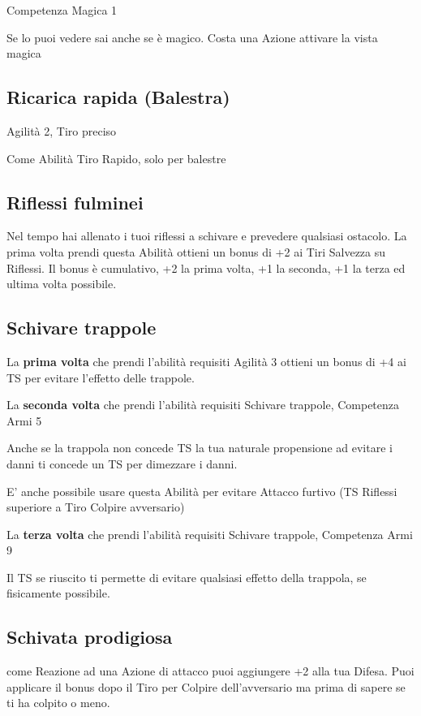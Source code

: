 \documentclass[a4paper,11pt,twoside,openany]{book}
\begin{document}
Competenza Magica 1

Se lo puoi vedere sai anche se è magico. Costa una Azione attivare la vista magica

\subsection{Ricarica rapida (Balestra)}

Agilità 2, Tiro preciso

Come Abilità Tiro Rapido, solo per balestre

\subsection{Riflessi fulminei}

Nel tempo hai allenato i tuoi riflessi a schivare e prevedere qualsiasi ostacolo. La prima volta prendi questa Abilità ottieni un bonus di +2 ai Tiri Salvezza su Riflessi. Il bonus è cumulativo, +2 la prima volta, +1 la seconda, +1 la terza ed ultima volta possibile.

\subsection{Schivare trappole}

La \textbf{prima volta} che prendi l'abilità requisiti Agilità 3 ottieni un bonus di +4 ai TS per evitare l'effetto delle trappole.

La \textbf{seconda volta} che prendi l'abilità requisiti Schivare trappole, Competenza Armi 5

Anche se la trappola non concede TS la tua naturale propensione ad evitare i danni ti concede un TS per dimezzare i danni.

E' anche possibile usare questa Abilità per evitare Attacco furtivo (TS Riflessi superiore a Tiro Colpire avversario)

La \textbf{terza volta} che prendi l'abilità requisiti Schivare trappole, Competenza Armi 9

Il TS se riuscito ti permette di evitare qualsiasi effetto della trappola, se fisicamente possibile.

\subsection{Schivata prodigiosa}

come Reazione ad una Azione di attacco puoi aggiungere +2 alla tua Difesa. Puoi applicare il bonus dopo il Tiro per Colpire dell'avversario ma prima di sapere se ti ha colpito o meno.
\end{document}

